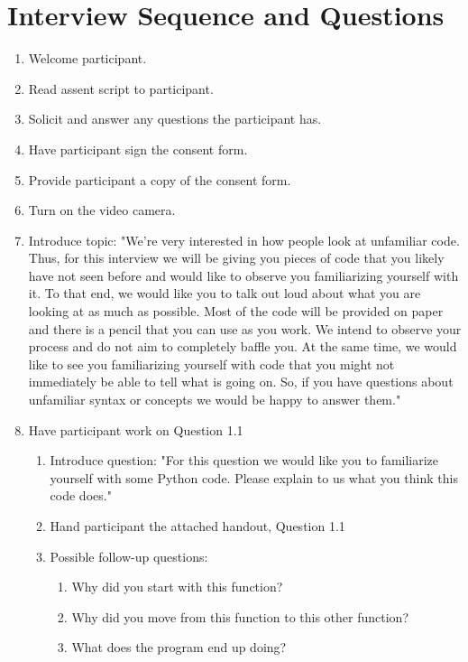 \documentclass{article}
\begin{document}
\section{Interview Sequence and Questions}
\begin{enumerate}
  \item Welcome participant.
  \item Read assent script to participant.
  \item Solicit and answer any questions the participant has.
  \item Have participant sign the consent form.
  \item Provide participant a copy of the consent form.
  \item Turn on the video camera.
  \item Introduce topic: "We're very interested in how people look at unfamiliar code. Thus, for this interview we will be giving you pieces of code that you likely have not seen before and would like to observe you familiarizing yourself with it. To that end, we would like you to talk out loud about what you are looking at as much as possible. Most of the code will be provided on paper and there is a pencil that you can use as you work. We intend to observe your process and do not aim to completely baffle you. At the same time, we would like to see you familiarizing yourself with code that you might not immediately be able to tell what is going on. So, if you have questions about unfamiliar syntax or concepts we would be happy to answer them."
  \item Have participant work on Question 1.1 \\
  \begin{enumerate}
    \item Introduce question: "For this question we would like you to familiarize yourself with some Python code. Please explain to us what you think this code does."
    \item Hand participant the attached handout, Question 1.1
    \item Possible follow-up questions:
    \begin{enumerate}
      \item Why did you start with this function?
      \item Why did you move from this function to this other function?
      \item What does the program end up doing?
    \end{enumerate}
  \end{enumerate}

\end{enumerate}
\end{document}
